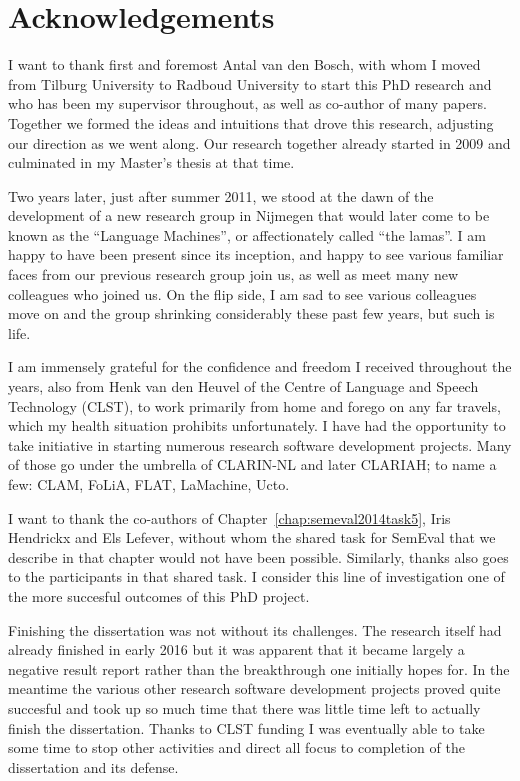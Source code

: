 \chapter*{Acknowledgements}

I want to thank first and foremost Antal van den Bosch, with whom I moved from
Tilburg University to Radboud University to start this PhD research and who has
been my supervisor throughout, as well as co-author of many papers. Together we formed
the ideas and intuitions that drove this research, adjusting our direction as
we went along. Our research together already started in 2009
and culminated in my Master's thesis at that time.

Two years later, just after summer 2011, we stood at the dawn of the
development of a new research group in Nijmegen that would later come to be
known as the ``Language Machines'', or affectionately called ``the lamas''.  I
am happy to have been present since its inception, and happy to see
various familiar faces from our previous research group join us, as well as
meet many new colleagues who joined us. On the flip side, I am sad to see various colleagues
move on and the group shrinking considerably these past few years, but such is life.

I am immensely grateful for the confidence and freedom I received throughout the
years, also from Henk van den Heuvel of the Centre of Language and Speech
Technology (CLST), to work primarily from home and forego on any far travels,
which my health situation prohibits unfortunately. I have had the opportunity to take
initiative in starting numerous research software development projects. Many of
those go under the umbrella of CLARIN-NL and later CLARIAH; to name a few:
CLAM, FoLiA, FLAT, LaMachine, Ucto.

I want to thank the co-authors of Chapter~\ref{chap:semeval2014task5}, Iris
Hendrickx and Els Lefever, without whom the shared task for SemEval that we
describe in that chapter would not have been possible. Similarly, thanks also
goes to the participants in that shared task. I consider this line of
investigation one of the more succesful outcomes of this PhD project.

Finishing the dissertation was not without its challenges. The research itself had already finished in early 2016 but it
was apparent that it became largely a negative result report rather than the breakthrough one initially hopes for. In
the meantime the various other research software development projects proved quite succesful and took up so much time
that there was little time left to actually finish the dissertation. Thanks to CLST funding I was eventually able to
take some time to stop other activities and direct all focus to completion of the dissertation and its defense.

